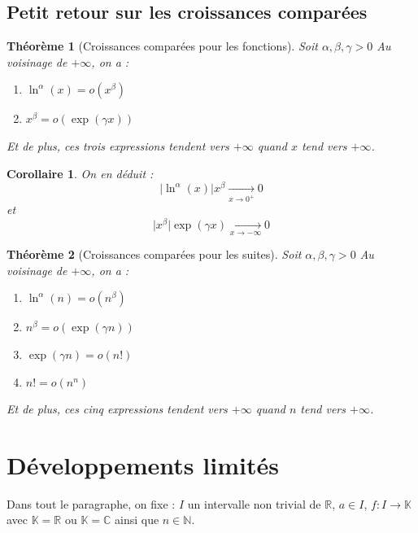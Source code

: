 \documentclass[french]{book}
\newcommand{\N}{\mathbb{N}}
\newcommand{\R}{\mathbb{R}}
\newcommand{\C}{\mathbb{C}}
\newcommand{\K}{\mathbb{K}}
\theoremstyle{plain}
\newtheorem{thm}{Théorème}[chapter]
\newtheorem{cor}{Corollaire}[chapter]
\theoremstyle{definition}
\theoremstyle{remark}
\begin{document}
\subsection{Petit retour sur les croissances comparées}
\begin{thm}[Croissances comparées pour les fonctions]
	Soit $\alpha,\beta,\gamma>0$ Au voisinage de $+\infty$, on a :
	\begin{enumerate}
		\item $\ln^\alpha(x)=o(x^\beta)$
		\item $x^\beta=o(\exp(\gamma x))$
	\end{enumerate}
	Et de plus, ces trois expressions tendent vers $+\infty$ quand $x$ tend vers $+\infty$.
\end{thm}
\begin{cor}
	On en déduit : $$\lvert\ln^\alpha(x)\rvert x^\beta \xrightarrow[x\to 0^+]{}0$$ et $$\lvert x^\beta\rvert \exp(\gamma x)\xrightarrow[x\to-\infty]{}0$$
\end{cor}
\begin{thm}[Croissances comparées pour les suites]
	Soit $\alpha,\beta,\gamma>0$ Au voisinage de $+\infty$, on a :
	\begin{enumerate}
		\item $\ln^\alpha(n)=o(n^\beta)$
		\item $n^\beta=o(\exp(\gamma n))$
		\item $\exp(\gamma n)=o(n!)$
		\item $n!=o(n^n)$
	\end{enumerate}
	Et de plus, ces cinq expressions tendent vers $+\infty$ quand $n$ tend vers $+\infty$.
\end{thm}
\section{Développements limités}
Dans tout le paragraphe, on fixe : $I$ un intervalle non trivial de $\R$, $a\in I$, $f:I\rightarrow\K$ avec $\K=\R$ ou $\K=\C$ ainsi que $n\in\N$.
\end{document}
